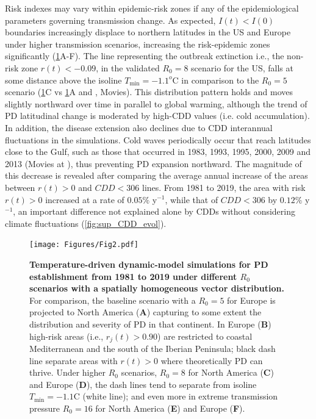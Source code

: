     Risk indexes may vary within epidemic-risk zones if any of the
    epidemiological
    parameters governing transmission change. As expected, $I(t) < I(0)$
    boundaries
    increasingly displace to northern latitudes in the US and Europe under
    higher
    transmission scenarios, increasing the risk-epidemic zones significantly
    (\cref{fig4}A-F). The line representing the outbreak extinction i.e., the
    non-risk zone $r(t)<-0.09$, in the validated $R_0=8$ scenario for the US,
    falls
    at some distance above the isoline $T_{\textrm{min}} = -1.1^o$C in
    comparison
    to the $R_0=5$ scenario (\cref{fig4}C vs \cref{fig4}A and \cite{Webpage},
    Movies). This distribution pattern holds and moves slightly northward over
    time
    in parallel to global warming, although the trend of PD latitudinal change
    is
    moderated by high-CDD values (i.e. cold accumulation). In addition, the
    disease
    extension also declines due to CDD interannual fluctuations in the
    simulations.
    Cold waves periodically occur that reach latitudes close to the Gulf, such
    as
    those that occurred in 1983, 1993, 1995, 2000, 2009 and 2013 (Movies at
    \cite{Webpage}), thus preventing PD expansion northward. The magnitude of
    this
    decrease is revealed after comparing the average annual increase of the
    areas
    between $r(t) > 0$ and $CDD < 306$ lines. From 1981 to 2019, the area with
    risk
$r(t) > 0$ increased at a rate of $0.05\%$ y$^{-1}$, while that of $CDD < 306$
    by $0.12\%$ y$^{-1}$, an important difference not explained alone by CDDs
    without considering climate fluctuations (\cref{fig:sup_CDD_evol}). \\

    \begin{figure}
        \centering
        \texttt{[image: Figures/Fig2.pdf]}
        \caption{\textbf{Temperature-driven dynamic-model simulations  for PD
                establishment from 1981 to 2019 under different $R_0$ scenarios
                with a
                spatially homogeneous vector distribution.} For comparison, the
            baseline
            scenario with a $R_0=5$ for Europe is projected to North America
            (\textbf{A})
            capturing to some extent the distribution and severity of PD in
            that continent.
            In Europe (\textbf{B}) high-risk areas (i.e., $r_j(t) > 0.90$) are
            restricted
            to coastal Mediterranean and the south of the Iberian Peninsula;
            black dash
            line separate areas with $r(t)>0$ where theoretically PD can
            thrive. Under
            higher $R_0$ scenarios, $R_0=8$ for North America (\textbf{C}) and
            Europe
            (\textbf{D}), the dash lines tend to separate from isoline
            $T_{\textrm{min}} =
                -1.1$\textdegree C (white line); and even more in extreme
            transmission pressure
            $R_0=16$ for North America (\textbf{E}) and Europe (\textbf{F}). }
        \label{fig4}
    \end{figure}

